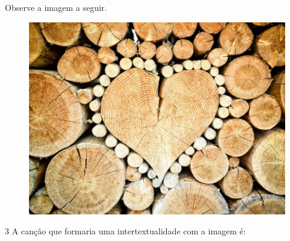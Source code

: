 

\pagebreak
Observe a imagem a seguir.

\begin{figure}[H]
\centering\includegraphics[width=\textwidth]{./imgSAEB_6_POR/media/image14.jpeg}
\end{figure}

\num{3} A canção que formaria uma intertextualidade com a imagem é:

